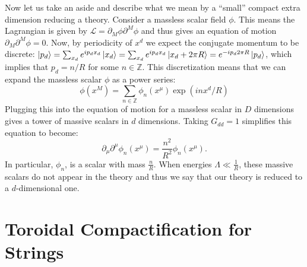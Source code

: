 \documentclass{report}
\theoremstyle{plain}
\theoremstyle{definition}
\theoremstyle{remark}
\newcommand{\FR}[2]{\frac{#1}{#2}}
\newcommand{\mc}{\mathcal}
\newcommand{\di}{\partial}
\newcommand{\bZ}{\mathbb{Z}}
\begin{document}
Now let us take an aside and describe what we mean by a ``small'' compact
extra dimension reducing a theory. Consider a massless scalar field $\phi$.
This means the Lagrangian is given by $\mc L = \di_M \phi \di^M \phi$ and
thus gives an equation of motion $\di_M\di^M\phi = 0$. Now, by periodicity
of $x^d$ we expect the conjugate momentum to be discrete: $\ket{p_d} =
\sum_{x_d} e^{ip_dx_d}\ket{x_d} = \sum_{x_d} e^{ip_dx_d}\ket{x_d+2\pi R} =
e^{-ip_d2\pi R}\ket{p_d}$, which implies that $p_d = n/R$ for some $n \in
\bZ$. This discretization means that we can expand the massless scalar
$\phi$ as a power series:
\[\phi(x^M) = \sum_{n\in\bZ} \phi_n(x^\mu)\exp(inx^d/R)\]
Plugging this into the equation of motion for a massless scalar in $D$
dimensions gives a tower of massive scalars in $d$ dimensions. Taking
$G_{dd}=1$ simplifies this equation to become:
\[ \di_\mu\di^\mu \phi_n(x^\mu) = \FR{n^2}{R^2}\phi_n(x^\mu).\]
In particular, $\phi_n$, is a scalar with mass $\FR{n}{R}$. When energies
$\Lambda \ll \FR{1}{R}$, these massive scalars do not appear in the theory
and thus we say that our theory is reduced to a $d$-dimensional one.

\section{Toroidal Compactification for Strings}
\end{document}
